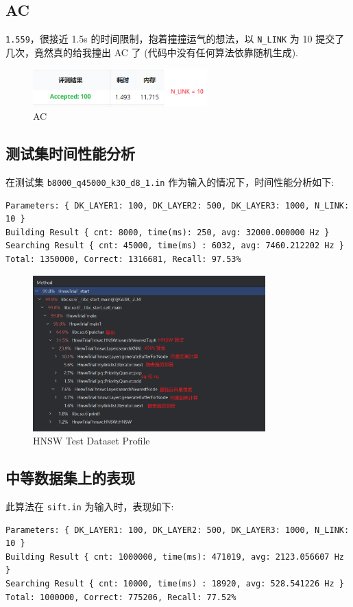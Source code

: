 \subsection{AC}

\texttt{1.559}，很接近 1.5s 的时间限制，抱着撞撞运气的想法，以 \texttt{N\_LINK} 为 10 提交了几次，竟然真的给我撞出
AC 了 (代码中没有任何算法依靠随机生成).

\begin{figure}[H]
    \centering
    \includegraphics[width=0.6\textwidth]{img/ac}
    \caption{AC}
\end{figure}

\subsection{测试集时间性能分析}

在测试集 \texttt{b8000\_q45000\_k30\_d8\_1.in} 作为输入的情况下，时间性能分析如下:

\begin{verbatim}
Parameters: { DK_LAYER1: 100, DK_LAYER2: 500, DK_LAYER3: 1000, N_LINK: 10 }
Building Result { cnt: 8000, time(ms): 250, avg: 32000.000000 Hz }
Searching Result { cnt: 45000, time(ms) : 6032, avg: 7460.212202 Hz }
Total: 1350000, Correct: 1316681, Recall: 97.53%
\end{verbatim}

\begin{figure}[H]
    \centering
    \includegraphics[width=0.8\textwidth]{img/hnsw-testdataset-profile}
    \caption{HNSW Test Dataset Profile}
\end{figure}

\subsection{中等数据集上的表现}

此算法在 \texttt{sift.in} 为输入时，表现如下:

\begin{verbatim}
Parameters: { DK_LAYER1: 100, DK_LAYER2: 500, DK_LAYER3: 1000, N_LINK: 10 }
Building Result { cnt: 1000000, time(ms): 471019, avg: 2123.056607 Hz }
Searching Result { cnt: 10000, time(ms) : 18920, avg: 528.541226 Hz }
Total: 1000000, Correct: 775206, Recall: 77.52%
\end{verbatim}